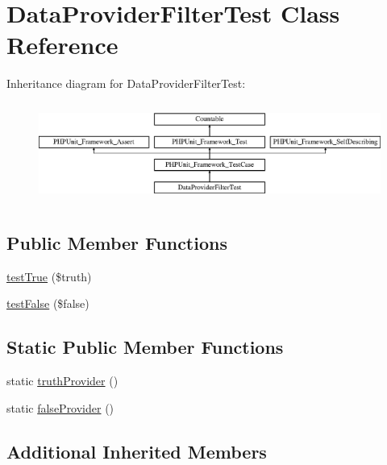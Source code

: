 \hypertarget{class_data_provider_filter_test}{}\section{Data\+Provider\+Filter\+Test Class Reference}
\label{class_data_provider_filter_test}
Inheritance diagram for Data\+Provider\+Filter\+Test\+:\begin{figure}[H]
\begin{center}
\leavevmode
\includegraphics[height=3.303835cm]{class_data_provider_filter_test}
\end{center}
\end{figure}
\subsection*{Public Member Functions}
\begin{DoxyCompactItemize}
\item 
\mbox{\hyperlink{class_data_provider_filter_test_a1985a5b5fa26ddd01577bd2e317e5693}{test\+True}} (\$truth)
\item 
\mbox{\hyperlink{class_data_provider_filter_test_a211193264dd1fea829037ebd025b33fd}{test\+False}} (\$false)
\end{DoxyCompactItemize}
\subsection*{Static Public Member Functions}
\begin{DoxyCompactItemize}
\item 
static \mbox{\hyperlink{class_data_provider_filter_test_acffdaf0ac8e420b155372a710c26516b}{truth\+Provider}} ()
\item 
static \mbox{\hyperlink{class_data_provider_filter_test_a4a6531b916d22e9af7b55c0a63f73988}{false\+Provider}} ()
\end{DoxyCompactItemize}
\subsection*{Additional Inherited Members}


